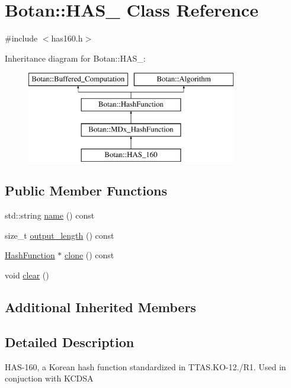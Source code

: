 \hypertarget{classBotan_1_1HAS__160}{\section{Botan\-:\-:H\-A\-S\-\_ Class Reference}
\label{classBotan_1_1HAS__160}
}


{\ttfamily \#include $<$has160.\-h$>$}

Inheritance diagram for Botan\-:\-:H\-A\-S\-\_\-:\begin{figure}[H]
\begin{center}
\leavevmode
\includegraphics[height=4.000000cm]{classBotan_1_1HAS__160}
\end{center}
\end{figure}
\subsection*{Public Member Functions}
\begin{DoxyCompactItemize}
\item 
std\-::string \hyperlink{classBotan_1_1HAS__160_ac6a68a79b0bef4806efeae02fd28e3ca}{name} () const 
\item 
size\-\_\-t \hyperlink{classBotan_1_1HAS__160_a194673e16eafd4a1ea666b22bf946702}{output\-\_\-length} () const 
\item 
\hyperlink{classBotan_1_1HashFunction}{Hash\-Function} $\ast$ \hyperlink{classBotan_1_1HAS__160_af5d92647f9a80833d75dee62a6c15f99}{clone} () const 
\item 
void \hyperlink{classBotan_1_1HAS__160_aaed236270a9c9cd285abbc05d83b64b1}{clear} ()
\end{DoxyCompactItemize}
\subsection*{Additional Inherited Members}


\subsection{Detailed Description}
H\-A\-S-\/160, a Korean hash function standardized in T\-T\-A\-S.\-K\-O-\/12./\-R1. Used in conjuction with K\-C\-D\-S\-A 

